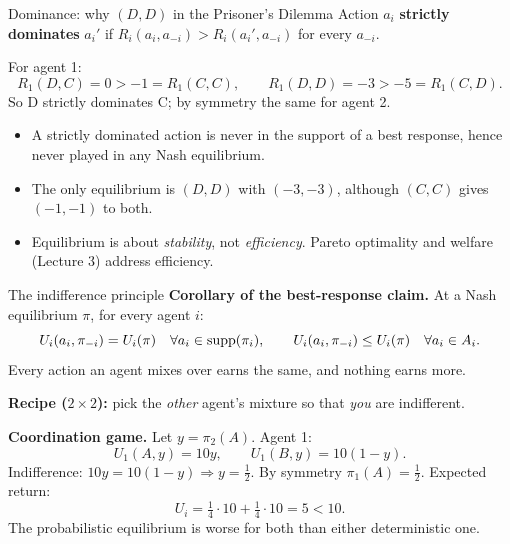 \documentclass[aspectratio=169,11pt]{beamer}
\begin{document}
\begin{frame}{Dominance: why $(D,D)$ in the Prisoner's Dilemma}
  Action $a_i$ \textbf{strictly dominates} $a_i'$ if $R_i(a_i, a_{-i}) > R_i(a_i', a_{-i})$ for every $a_{-i}$.
  \bigskip

  For agent 1:
  \[
    R_1(D, C) = 0 > -1 = R_1(C, C), \qquad R_1(D, D) = -3 > -5 = R_1(C, D).
  \]
  So D strictly dominates C; by symmetry the same for agent 2.
  \begin{itemize}
    \item A strictly dominated action is never in the support of a best response, hence never played in any Nash equilibrium.
    \item The only equilibrium is $(D,D)$ with $(-3,-3)$, although $(C,C)$ gives $(-1,-1)$ to both.
    \item Equilibrium is about \emph{stability}, not \emph{efficiency}. Pareto optimality and welfare (Lecture 3) address efficiency.
  \end{itemize}
\end{frame}

\begin{frame}{The indifference principle}
  \textbf{Corollary of the best-response claim.} At a Nash equilibrium $\pi$, for every agent $i$:
  \[
    U_i(a_i, \pi_{-i}) = U_i(\pi) \quad \forall a_i \in \operatorname{supp}(\pi_i), \qquad
    U_i(a_i, \pi_{-i}) \le U_i(\pi) \quad \forall a_i \in A_i .
  \]
  Every action an agent mixes over earns the same, and nothing earns more.
  \bigskip

  \textbf{Recipe ($2 \times 2$):} pick the \emph{other} agent's mixture so that \emph{you} are indifferent.
  \bigskip

  \textbf{Coordination game.} Let $y = \pi_2(A)$. Agent 1:
  \[
    U_1(A, y) = 10y, \qquad U_1(B, y) = 10(1 - y).
  \]
  Indifference: $10y = 10(1-y) \Rightarrow y = \tfrac12$. By symmetry $\pi_1(A) = \tfrac12$. Expected return:
  \[
    U_i = \tfrac14 \cdot 10 + \tfrac14 \cdot 10 = 5 < 10 .
  \]
  The probabilistic equilibrium is worse for both than either deterministic one.
\end{frame}
\end{document}
